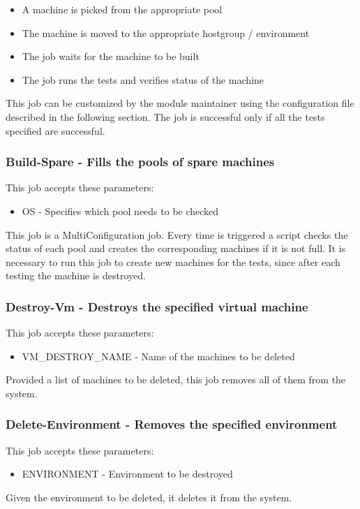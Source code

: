 \begin{itemize}
  \item A machine is picked from the appropriate pool
  \item The machine is moved to the appropriate hostgroup / environment
  \item The job waits for the machine to be built
  \item The job runs the tests and verifies status of the machine
\end{itemize}

This job can be customized by the module maintainer using the
configuration file described in the following section. The job is
successful only if all the tests specified are successful.

\subsubsection{Build-Spare - Fills the pools of spare machines}

This job accepts these parameters:

\begin{itemize}
  \item OS - Specifies which pool needs to be checked
\end{itemize}

This job is a MultiConfiguration job. Every time is triggered a script
checks the status of each pool and creates the corresponding machines if
it is not full. It is necessary to run this job to create new machines for
the tests, since after each testing the machine is destroyed.

\subsubsection{Destroy-Vm - Destroys the specified virtual machine}

This job accepts these parameters:

\begin{itemize}
  \item VM\_DESTROY\_NAME - Name of the machines to be deleted
\end{itemize}

Provided a list of machines to be deleted, this job removes all of them
from the system.

\subsubsection{Delete-Environment - Removes the specified environment}

This job accepts these parameters:

\begin{itemize}
  \item ENVIRONMENT - Environment to be destroyed
\end{itemize}

Given the environment to be deleted, it deletes it from the system.
